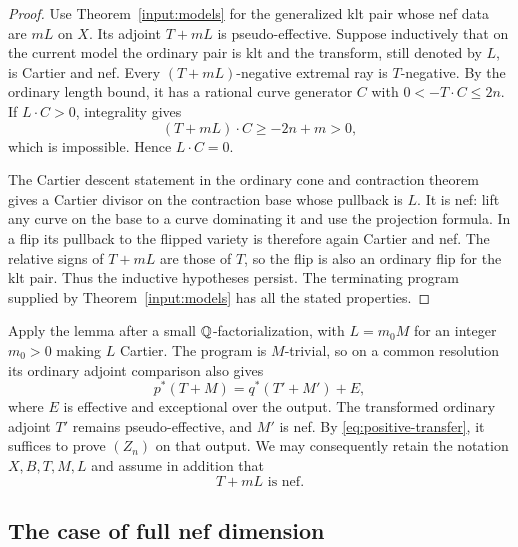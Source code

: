 \begin{proof}
Use Theorem~\ref{input:models} for the generalized klt pair whose
nef data are $mL$ on $X$.  Its adjoint $T+mL$ is pseudo-effective.
Suppose inductively that on the current model the ordinary pair is
klt and the transform, still denoted by $L$, is Cartier and nef.
Every $(T+mL)$-negative extremal ray is $T$-negative.  By the ordinary
length bound, it has a rational curve generator $C$ with
$0<-T\cdot C\leq2n$.  If $L\cdot C>0$, integrality gives
\[
                      (T+mL)\cdot C\geq-2n+m>0,
\]
which is impossible.  Hence $L\cdot C=0$.

The Cartier descent statement in the ordinary cone and contraction
theorem gives a Cartier divisor on the contraction base whose
pullback is $L$.  It is nef: lift any curve on the base to a curve
dominating it and use the projection formula.  In a flip its
pullback to the flipped variety is therefore again Cartier and nef.
The relative signs of $T+mL$ are those of $T$, so the flip is also
an ordinary flip for the klt pair.  Thus the inductive hypotheses
persist.  The terminating program supplied by
Theorem~\ref{input:models} has all the stated properties.
\end{proof}

Apply the lemma after a small $\mathbb Q$-factorialization, with
$L=m_0M$ for an integer $m_0>0$ making $L$ Cartier.  The program is
$M$-trivial, so on a common resolution its ordinary adjoint
comparison also gives
\[
                     p^*(T+M)=q^*(T'+M')+E,
\]
where $E$ is effective and exceptional over the output.  The
transformed ordinary adjoint $T'$ remains pseudo-effective, and
$M'$ is nef.  By \eqref{eq:positive-transfer}, it suffices to prove
$(Z_n)$ on that output.  We may consequently retain the notation
$X,B,T,M,L$ and assume in addition that
\begin{equation}\label{eq:large-adjoint-nef}
                               T+mL\text{ is nef}.
\end{equation}

\subsection{The case of full nef dimension}

